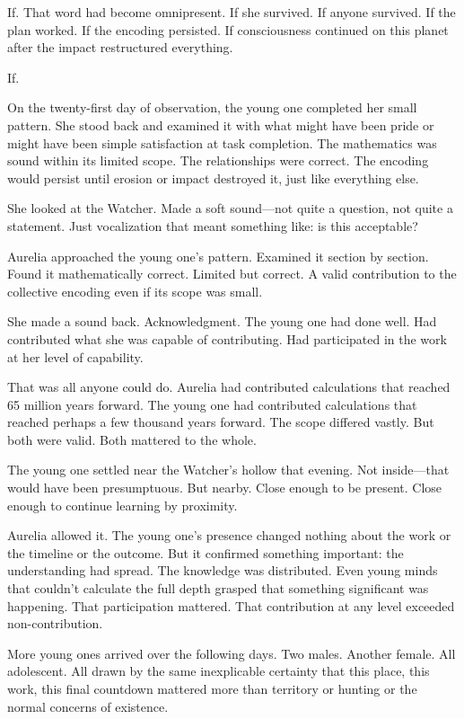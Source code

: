 If. That word had become omnipresent. If she survived. If anyone survived. If the plan worked. If the encoding persisted. If consciousness continued on this planet after the impact restructured everything.

If.

\scenebreak

On the twenty-first day of observation, the young one completed her small pattern. She stood back and examined it with what might have been pride or might have been simple satisfaction at task completion. The mathematics was sound within its limited scope. The relationships were correct. The encoding would persist until erosion or impact destroyed it, just like everything else.

She looked at the Watcher. Made a soft sound—not quite a question, not quite a statement. Just vocalization that meant something like: is this acceptable?

Aurelia approached the young one's pattern. Examined it section by section. Found it mathematically correct. Limited but correct. A valid contribution to the collective encoding even if its scope was small.

She made a sound back. Acknowledgment. The young one had done well. Had contributed what she was capable of contributing. Had participated in the work at her level of capability.

That was all anyone could do. Aurelia had contributed calculations that reached 65 million years forward. The young one had contributed calculations that reached perhaps a few thousand years forward. The scope differed vastly. But both were valid. Both mattered to the whole.

The young one settled near the Watcher's hollow that evening. Not inside—that would have been presumptuous. But nearby. Close enough to be present. Close enough to continue learning by proximity.

Aurelia allowed it. The young one's presence changed nothing about the work or the timeline or the outcome. But it confirmed something important: the understanding had spread. The knowledge was distributed. Even young minds that couldn't calculate the full depth grasped that something significant was happening. That participation mattered. That contribution at any level exceeded non-contribution.

\scenebreak

More young ones arrived over the following days. Two males. Another female. All adolescent. All drawn by the same inexplicable certainty that this place, this work, this final countdown mattered more than territory or hunting or the normal concerns of existence.

